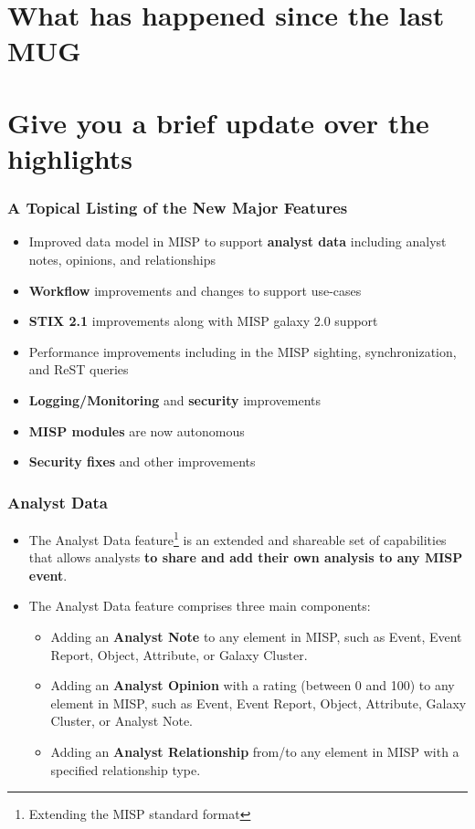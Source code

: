 
\begin{frame}
\titlepage
\end{frame}


\section{What has happened since the last MUG}

\section{Give you a brief update over the highlights}

\begin{frame}
  \frametitle{A Topical Listing of the New Major Features}
  \begin{itemize}
      \item Improved data model in MISP to support \textbf{analyst data} including analyst notes, opinions, and relationships
      \item \textbf{Workflow} improvements and changes to support use-cases
      \item \textbf{STIX 2.1} improvements along with MISP galaxy 2.0 support
      \item Performance improvements including in the MISP sighting, synchronization, and ReST queries
      \item \textbf{Logging/Monitoring} and \textbf{security} improvements
      \item \textbf{MISP modules} are now autonomous
      \item \textbf{Security fixes} and other improvements
  \end{itemize}
\end{frame}

\begin{frame}
  \frametitle{Analyst Data}
  \begin{itemize}
       \item The Analyst Data feature\footnote{Extending the MISP standard format} is an extended and shareable set of capabilities that allows analysts \textbf{to share and add their own analysis to any MISP event}.
       \item The Analyst Data feature comprises three main components:
       \begin{itemize}
             \item Adding an \textbf{Analyst Note} to any element in MISP, such as Event, Event Report, Object, Attribute, or Galaxy Cluster.
             \item Adding an \textbf{Analyst Opinion} with a rating (between 0 and 100) to any element in MISP, such as Event, Event Report, Object, Attribute, Galaxy Cluster, or Analyst Note.
             \item Adding an \textbf{Analyst Relationship} from/to any element in MISP with a specified relationship type.
       \end{itemize}
  \end{itemize}
\end{frame}

